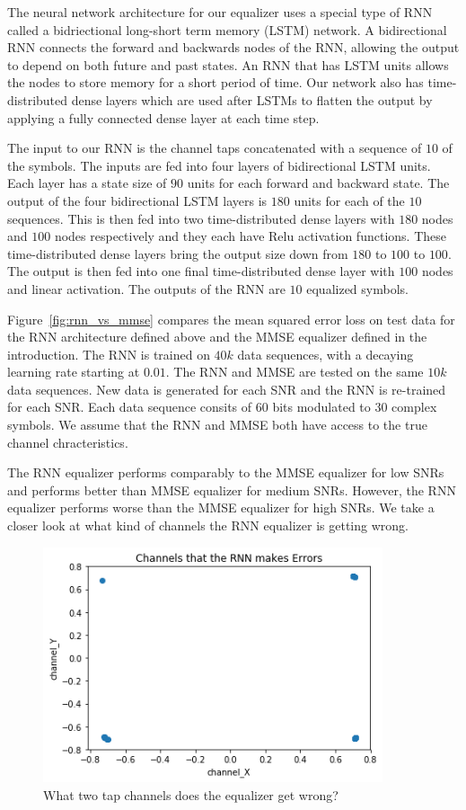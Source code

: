 The neural network architecture for our equalizer uses a special type of RNN called a bidriectional long-short term memory (LSTM) network.  
A bidirectional RNN connects the forward and backwards nodes of the RNN, allowing the output to depend on both future and past states.
An RNN that has LSTM units allows the nodes to store memory for a short period of time.
Our network also has time-distributed dense layers which are used after LSTMs to flatten the output by applying a fully connected dense layer at each time step.

The input to our RNN is the channel taps concatenated with a sequence of $10$ of the symbols.  The inputs are fed into four layers of bidirectional LSTM units.  Each layer has a state size of $90$ units for each forward and backward state.  The output of the four bidirectional LSTM layers is $180$ units for each of the $10$ sequences.  
This is then fed into two time-distributed dense layers with $180$ nodes and $100$ nodes respectively and they each have Relu activation functions. These time-distributed dense layers bring the output size down from $180$ to $100$ to $100$.  The output is then fed into one final time-distributed dense layer with $100$ nodes and linear activation.  The outputs of the RNN are $10$ equalized symbols.  


Figure~\ref{fig:rnn_vs_mmse} compares the mean squared error loss on test data for the RNN architecture defined above and the MMSE equalizer defined in the introduction.  
The RNN is trained on $40k$ data sequences, with a decaying learning rate starting at $0.01$.
The RNN and MMSE are tested on the same $10k$ data sequences.  New data is generated for each SNR and the RNN is re-trained for each SNR.  Each data sequence consits of $60$ bits modulated to $30$ complex symbols.
We assume that the RNN and MMSE both have access to the true channel chracteristics.

The RNN equalizer performs comparably to the MMSE equalizer for low SNRs and performs better than MMSE equalizer for medium SNRs.  However, the RNN equalizer performs worse than the MMSE equalizer for high SNRs.  We take a closer look at what kind of channels the RNN equalizer is getting wrong.

\begin{figure}
\begin{center}
\includegraphics[width=100mm]{figures/equal/incorrect_channels.png}
\caption{What two tap channels does the equalizer get wrong?}
\label{fig:incorr_chan}
\end{center}
\end{figure}

